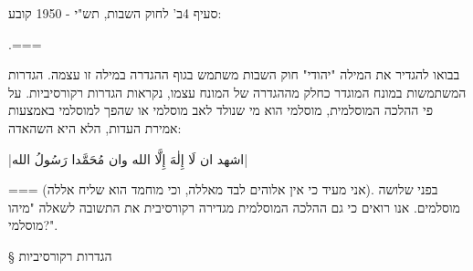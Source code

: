 סעיף 4ב' לחוק השבות, תש"י - 1950 קובע:

.===

בבואו להגדיר את המילה "יהודי" חוק השבות משתמש בגוף ההגדרה במילה זו עצמה.
הגדרות המשתמשות במונח המוגדר כחלק מההגדרה של המונח עצמו, נקראות הגדרות
רקורסיביות. על פי ההלכה המוסלמית, מוסלמי הוא מי שנולד לאב מוסלמי או שהפך
למוסלמי באמצעות אמירת העדות, הלא היא השהאדה:
\begin{Arabic}
  \ע|اشهد ان لَا إِلٰهَ إِلَّا الله وان مُحَمَّدا رَسُولُ الله|
\end{Arabic}
===
(אני מעיד כי אין אלוהים לבד מאללה, וכי מוחמד הוא שליח אללה). בפני שלושה
מוסלמים. אנו רואים כי גם ההלכה המוסלמית מגדירה רקורסיבית את התשובה לשאלה "מיהו
מוסלמי?".

§ הגדרות רקורסיביות

